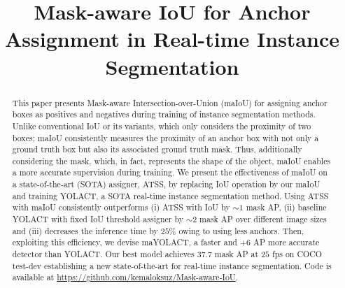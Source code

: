 \documentclass{bmvc2k}
\title{Mask-aware IoU for Anchor Assignment in Real-time Instance Segmentation}
\begin{document}
\maketitle

\begin{abstract}
This paper presents Mask-aware Intersection-over-Union (maIoU) for assigning anchor boxes as positives and negatives during training of instance segmentation methods. Unlike conventional IoU or its variants, which only considers the proximity of two boxes; maIoU consistently measures the proximity of an anchor box with not only a ground truth box but also its associated ground truth mask. Thus, additionally considering  the mask, which, in fact, represents the shape of the object, maIoU enables a more accurate supervision during training. We present the effectiveness of maIoU on a state-of-the-art (SOTA) assigner, ATSS, by replacing IoU operation by our maIoU and training YOLACT, a SOTA real-time instance segmentation method. Using ATSS with maIoU consistently outperforms (i) ATSS with IoU by $\sim 1$ mask AP, (ii) baseline YOLACT with fixed IoU threshold assigner by $\sim 2$ mask AP over different image sizes and (iii) decreases the inference time by $25 \%$ owing to using less anchors. Then, exploiting this efficiency, we devise maYOLACT, a faster and $+6$ AP more accurate detector than YOLACT. Our best model achieves $37.7$ mask AP at $25$ fps on COCO test-dev establishing a new state-of-the-art for real-time instance segmentation. Code is available at \url{https://github.com/kemaloksuz/Mask-aware-IoU}.
\end{abstract}
\end{document}
